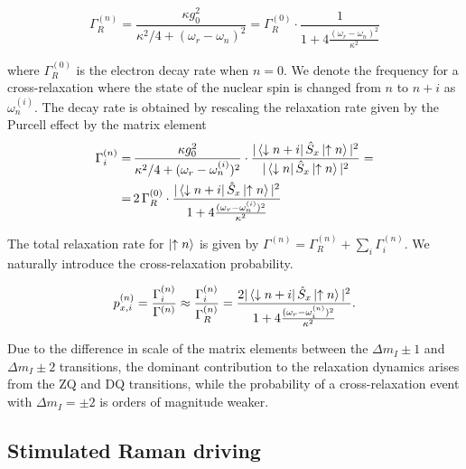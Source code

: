 \begin{equation}
    \Gamma^{(n)}_R = \frac{\kappa g_0^2}{\kappa^2/4 + (\omega_r - \omega_n)^2} =  \Gamma^{(0)}_R \cdot \frac{1}{1 + 4\frac{(\omega_r - \omega_n)^2}{\kappa^2}}
\end{equation}


where $\Gamma^{(0)}_R$ is the electron decay rate when $n=0$. We denote the frequency for a cross-relaxation where the state of the nuclear spin is changed from $n$ to $n+i$ as $\omega_{n}^{(i)}$. The decay rate is obtained by rescaling the relaxation rate given by the Purcell effect by the matrix element
\begin{align}
\begin{split}
    \Gamma^{(n)}_{i} =&\, \frac{\kappa g_0^2}{\kappa^2/4 + (\omega_r - \omega_n^{(i)})^2} \cdot \frac{|\bra{\downarrow n+i}\hat{S}_x\ket{\uparrow n}|^2}{|\bra{\downarrow n}\hat{S}_x\ket{\uparrow n}|^2} = \\ 
    =&\, 2\,\Gamma^{(0)}_R \cdot \frac{|\bra{\downarrow n+i}\hat{S}_x\ket{\uparrow n}|^2}{1 + 4\frac{(\omega_r - \omega_{n}^{(i)})^2}{\kappa^2}}
\end{split}
\end{align}

The total relaxation rate for $\ket{\uparrow n}$ is given by $\Gamma^{(n)} = \Gamma^{(n)}_R + \sum_i\Gamma^{(n)}_i$. We naturally introduce the cross-relaxation probability.

\begin{equation}
    \label{eq:cross_relaxation_probability_ninehalf}
    p^{(n)}_{x,i} = \frac{\Gamma^{(n)}_i}{\Gamma^{(n)}} \approx \frac{\Gamma^{(n)}_i}{\Gamma^{(n)}_R} = \frac{2|\bra{\downarrow n+i}\hat{S}_x\ket{\uparrow n}|^2}{1 + 4\frac{(\omega_r - \omega^{(n)}_i)^2}{\kappa^2}}.
\end{equation}

Due to the difference in scale of the matrix elements between the $\Delta m_I \pm 1$ and $\Delta m_I \pm 2$ transitions, the dominant contribution to the relaxation dynamics arises from the ZQ and DQ transitions, while the probability of a cross-relaxation event with $\Delta m_I = \pm2$ is orders of magnitude weaker.


\subsection{Stimulated Raman driving}

